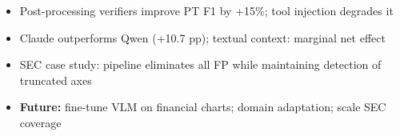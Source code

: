 \documentclass[border=8pt]{standalone}
\begin{document}
\begin{minipage}{16cm}
\begin{tcolorbox}[colback=dblue!5, colframe=dblue, arc=6pt,
  title={\large\bfseries Conclusion \& Future Work},
  fonttitle=\color{white}, coltitle=white, colbacktitle=dblue]
\begin{itemize}\setlength{\itemsep}{2pt}
\item Post-processing verifiers improve PT F1 by +15\%; tool injection degrades it
\item Claude outperforms Qwen (+10.7 pp); textual context: marginal net effect
\item SEC case study: pipeline eliminates all FP while maintaining detection of truncated axes
\item \textbf{Future:} fine-tune VLM on financial charts; domain adaptation; scale SEC coverage
\end{itemize}
\end{tcolorbox}

\end{minipage}
\end{document}
